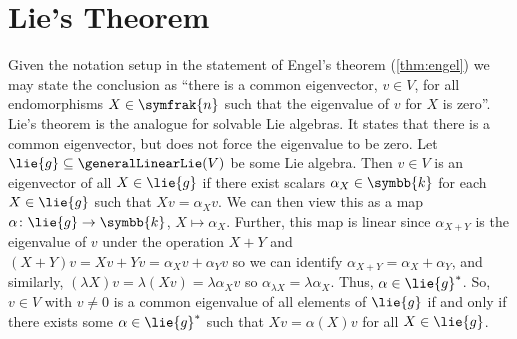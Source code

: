 \documentclass[fleqn]{NotesClass}
\renewcommand{\field}{\symbb{k}}
\newcommand{\nilpotentLie}{\symfrak{n}}
\begin{document}
    \section{Lie's Theorem}
    Given the notation setup in the statement of Engel's theorem (\cref{thm:engel}) we may state the conclusion as \enquote{there is a common eigenvector, \(v \in V\), for all endomorphisms \(X \in \nilpotentLie\) such that the eigenvalue of \(v\) for \(X\) is zero}.
    Lie's theorem is the analogue for solvable Lie algebras.
    It states that there is a common eigenvector, but does not force the eigenvalue to be zero.
    Let \(\lie{g} \subseteq \generalLinearLie(V)\) be some Lie algebra.
    Then \(v \in V\) is an eigenvector of all \(X \in \lie{g}\) if there exist scalars \(\alpha_X \in \field\) for each \(X \in \lie{g}\) such that \(Xv = \alpha_X v\).
    We can then view this as a map \(\alpha \colon \lie{g} \to \field\), \(X \mapsto \alpha_X\).
    Further, this map is linear since \(\alpha_{X + Y}\) is the eigenvalue of \(v\) under the operation \(X + Y\) and \((X + Y)v = Xv + Yv = \alpha_X v + \alpha_Y v\) so we can identify \(\alpha_{X + Y} = \alpha_X + \alpha_Y\), and similarly, \((\lambda X)v = \lambda(Xv) = \lambda \alpha_X v\) so \(\alpha_{\lambda X} = \lambda \alpha_X\).
    Thus, \(\alpha \in \lie{g}^*\).
    So, \(v \in V\) with \(v \ne 0\) is a common eigenvalue of all elements of \(\lie{g}\) if and only if there exists some \(\alpha \in \lie{g}^*\) such that \(Xv = \alpha(X)v\) for all \(X \in \lie{g}\).
    
\end{document}
